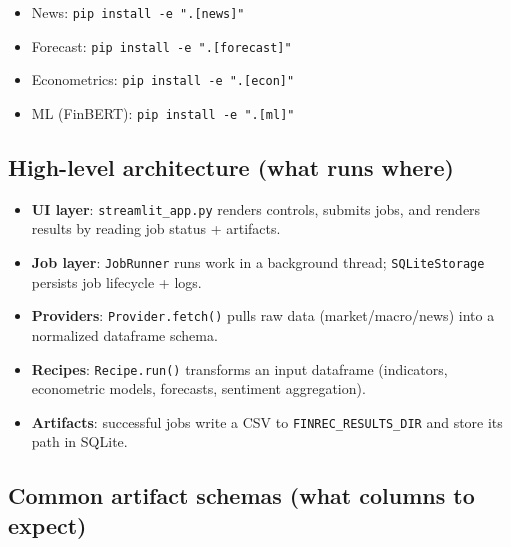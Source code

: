 \documentclass[11pt]{article}
\begin{document}
\begin{itemize}[leftmargin=*,nosep]
\item News: \texttt{pip install -e ".[news]"}
\end{itemize}


\begin{itemize}[leftmargin=*,nosep]
\item Forecast: \texttt{pip install -e ".[forecast]"}
\end{itemize}


\begin{itemize}[leftmargin=*,nosep]
\item Econometrics: \texttt{pip install -e ".[econ]"}
\end{itemize}


\begin{itemize}[leftmargin=*,nosep]
\item ML (FinBERT): \texttt{pip install -e ".[ml]"}
\end{itemize}



\subsection{High-level architecture (what runs where)}

\begin{itemize}[leftmargin=*,nosep]
\item \textbf{UI layer}: \texttt{streamlit\_app.py} renders controls, submits jobs, and renders results by reading job status + artifacts.
\item \textbf{Job layer}: \texttt{JobRunner} runs work in a background thread; \texttt{SQLiteStorage} persists job lifecycle + logs.
\item \textbf{Providers}: \texttt{Provider.fetch()} pulls raw data (market/macro/news) into a normalized dataframe schema.
\item \textbf{Recipes}: \texttt{Recipe.run()} transforms an input dataframe (indicators, econometric models, forecasts, sentiment aggregation).
\item \textbf{Artifacts}: successful jobs write a CSV to \texttt{FINREC\_RESULTS\_DIR} and store its path in SQLite.
\end{itemize}


\subsection{Common artifact schemas (what columns to expect)}
\end{document}
